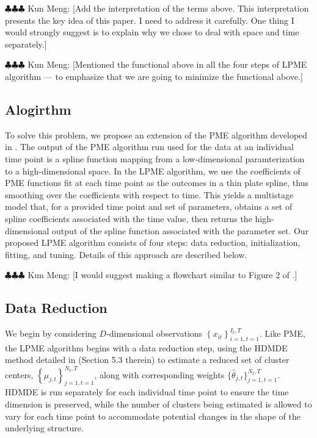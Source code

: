 \documentclass[11pt,reqno]{article}
\newcommand{\commentout}[1]{}
\newcommand{\meng}[1]{{\color{purple} \sf $\clubsuit\clubsuit\clubsuit$ Kun Meng: [#1]}}
\theoremstyle{definition}
\begin{document}
\meng{Add the interpretation of the terms above. This interpretation presents the key idea of this paper. I need to address it carefully. One thing I would strongly suggest is to explain why we chose to deal with space and time separately.}

\meng{Mentioned the functional above in all the four steps of LPME algorithm --- to emphasize that we are going to minimize the functional above.}

\commentout{Note that we assume changes over time to be smooth. Therefore, we seek a function $f^{*}$ that minimizes $\mathcal{D}_X(f^{*})$ while penalizing both the roughness of the function over the time-independent shape and the changes in the function over time, expressed as }

\subsection{Alogirthm}

To solve this problem, we propose an extension of the PME algorithm developed in \cite{mengPrincipalManifoldEstimation2021}. The output of the PME algorithm run used for the data at an individual time point is a spline function mapping from a low-dimensional paramterization to a high-dimensional space. In the LPME algorithm, we use the coefficients of PME functions fit at each time point as the outcomes in a thin plate spline, thus smoothing over the coefficients with respect to time. This yields a multistage model that, for a provided time point and set of parameters, obtains a set of spline coefficients associated with the time value, then returns the high-dimensional output of the spline function associated with the parameter set. Our proposed LPME algorithm consists of four steps: data reduction, initialization, fitting, and tuning. Details of this approach are described below.

\meng{I would suggest making a flowchart similar to Figure 2 of \cite{mengPrincipalManifoldEstimation2021}.}

\subsection*{Data Reduction}
We begin by considering $D$-dimensional observations $\left\{x_{it}\right\}_{i=1, t=1}^{I_t, T}$. Like PME, the LPME algorithm begins with a data reduction step, using the HDMDE method detailed in \cite{mengPrincipalManifoldEstimation2021} (Section 5.3 therein) to estimate a reduced set of cluster centers, $\left\{\mu_{j, t}\right\}_{j=1, t=1}^{N_t, T}$, along with corresponding weights $\{\hat{\theta}_{j, t}\}_{j=1, t=1}^{N_t, T}$. HDMDE is run separately for each individual time point to ensure the time dimension is preserved, while the number of clusters being estimated is allowed to vary for each time point to accommodate potential changes in the shape of the underlying structure. 
\end{document}
